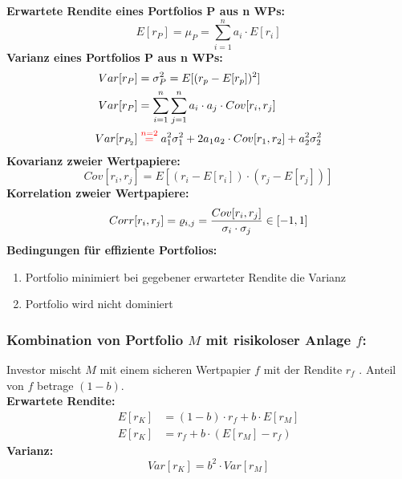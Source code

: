 \documentclass[leqno]{scrartcl}
\begin{document}
\begin{multicols}{4}
\textbf{Erwartete Rendite eines Portfolios P aus n WPs:}
  \begin{equation*}
    E[r_P] =\mu_P= \sum^{n}_{i=1} a_i \cdot E[r_i]
  \end{equation*}
\textbf{Varianz eines Portfolios P aus n WPs:}
  \begin{equation*}
    \begin{split}
      Var[r_P] &=\sigma_P^2 = E[(r_p-E[r_p])^2]\\
      Var[r_P] &=\sum^{n}_{i=1}\sum^{n}_{j=1}a_i \cdot a_j \cdot Cov[r_i,r_j]\\
      Var[r_{P_{2}}] &\overset{\color{red}{n=2}}{=} a^2_1 \sigma^2_1 + 2a_1a_2 \cdot Cov[r_1,r_2] + a^2_2 \sigma^2_2
    \end{split}
  \end{equation*}
\textbf{Kovarianz zweier Wertpapiere:}
  \begin{equation*}
      Cov[r_i,r_j] = E[(r_i-E[r_i]) \cdot (r_j-E[r_j])]
  \end{equation*}
\textbf{Korrelation zweier Wertpapiere:}
  \begin{equation*}
      Corr[r_i,r_j] = \varrho_{i,j} = \frac{Cov[r_i,r_j]}{\sigma_i \cdot \sigma_j}\in [-1,1]\\
  \end{equation*}
\textbf{Bedingungen für effiziente Portfolios:}
  \begin{enumerate}
    \item Portfolio minimiert bei gegebener erwarteter Rendite die Varianz
    \item Portfolio wird nicht dominiert
  \end{enumerate}
  
\subsubsection{Kombination von Portfolio $M$ mit risikoloser Anlage $f$:}

Investor mischt $M$ mit einem sicheren Wertpapier $f$ mit der Rendite $r_f$ . Anteil von $f$ betrage $(1 - b)$.\\
\textbf{Erwartete Rendite:}
  \begin{equation*}
    \begin{split}
      E[r_K] &= (1-b) \cdot r_f + b \cdot E[r_M]\\
      E[r_K] &= r_f + b \cdot (E[r_M ] - r_f)
    \end{split}
  \end{equation*}
\textbf{Varianz:}
  \begin{equation*}
      Var[r_K] = b^2 \cdot Var[r_M]
  \end{equation*}

\end{multicols}
\end{document}

